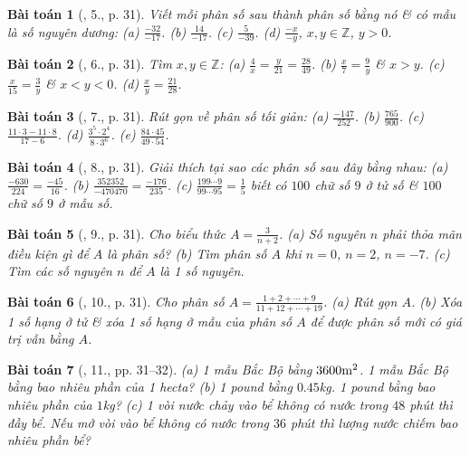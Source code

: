 \documentclass{article}
\newtheorem{baitoan}{Bài toán}
\begin{document}
\begin{baitoan}[\cite{SBT_Toan_6_Canh_Dieu_tap_2}, 5., p. 31]
	Viết mỗi phân số sau thành phân số bằng nó \& có mẫu là số nguyên dương: (a) $\frac{-32}{-17}$. (b) $\frac{14}{-17}$. (c) $\frac{5}{-39}$. (d) $\frac{-x}{-y}$, $x,y\in\mathbb{Z}$, $y > 0$.
\end{baitoan}

\begin{baitoan}[\cite{SBT_Toan_6_Canh_Dieu_tap_2}, 6., p. 31]
	Tìm $x,y\in\mathbb{Z}$: (a) $\frac{4}{x} = \frac{y}{21} = \frac{28}{49}$. (b) $\frac{x}{7} = \frac{9}{y}$ \& $x > y$. (c) $\frac{x}{15} = \frac{3}{y}$ \& $x < y < 0$. (d) $\frac{x}{y} = \frac{21}{28}$.
\end{baitoan}

\begin{baitoan}[\cite{SBT_Toan_6_Canh_Dieu_tap_2}, 7., p. 31]
	Rút gọn về phân số tối giản: (a) $\frac{-147}{252}$. (b) $\frac{765}{900}$. (c) $\frac{11\cdot3 - 11\cdot8}{17 - 6}$. (d) $\frac{3^5\cdot2^4}{8\cdot3^6}$. (e) $\frac{84\cdot45}{49\cdot54}$.
\end{baitoan}

\begin{baitoan}[\cite{SBT_Toan_6_Canh_Dieu_tap_2}, 8., p. 31]
	Giải thích tại sao các phân số sau đây bằng nhau: (a) $\frac{-630}{224} = \frac{-45}{16}$. (b) $\frac{352352}{-470470} = \frac{-176}{235}$. (c) $\frac{199\cdots9}{99\cdots95} = \frac{1}{5}$ biết có $100$ chữ số $9$ ở tử số \& $100$ chữ số $9$ ở mẫu số.
\end{baitoan}

\begin{baitoan}[\cite{SBT_Toan_6_Canh_Dieu_tap_2}, 9., p. 31]
	Cho biểu thức $A = \frac{3}{n + 2}$. (a) Số nguyên $n$ phải thỏa mãn điều kiện gì để $A$ là phân số? (b) Tìm phân số $A$ khi $n = 0$, $n = 2$, $n = -7$. (c) Tìm các số nguyên $n$ để $A$ là 1 số nguyên.
\end{baitoan}

\begin{baitoan}[\cite{SBT_Toan_6_Canh_Dieu_tap_2}, 10., p. 31]
	Cho phân số $A = \frac{1 + 2 + \cdots + 9}{11 + 12 + \cdots + 19}$. (a) Rút gọn $A$. (b) Xóa 1 số hạng ở tử \& xóa 1 số hạng ở mẫu của phân số $A$ để được phân số mới có giá trị vẫn bằng $A$.
\end{baitoan}

\begin{baitoan}[\cite{SBT_Toan_6_Canh_Dieu_tap_2}, 11., pp. 31--32]
	(a) 1 mẫu Bắc Bộ bằng $\rm3600m^2$. 1 mẫu Bắc Bộ bằng bao nhiêu phần của 1 hecta? (b) 1 pound bằng $0.45$\emph{kg}. 1 pound bằng bao nhiêu phần của $1$\emph{kg}? (c) 1 vòi nước chảy vào bể không có nước trong $48$ phút thì đầy bể. Nếu mở vòi vào bể không có nước trong $36$ phút thì lượng nước chiếm bao nhiêu phần bể?
\end{baitoan}
\end{document}
